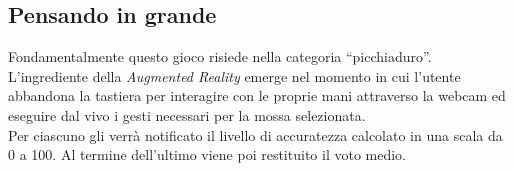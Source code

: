 \documentclass[a4paper,10pt, twocolumn]{article}
\begin{document}
  \subsection{Pensando in grande}
  Fondamentalmente questo gioco risiede nella categoria ``picchiaduro''.
  L'ingrediente della \emph{Augmented Reality} emerge nel
  momento in cui l'utente abbandona la tastiera per interagire con le proprie mani 
  attraverso la webcam ed eseguire dal vivo i gesti necessari per la mossa selezionata.\\
  Per ciascuno gli verr\`{a} notificato il livello di accuratezza 
  calcolato in una scala da 0 a 100.
  Al termine dell'ultimo viene poi restituito il voto medio.
  
\end{document}
